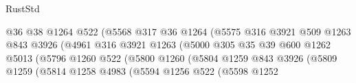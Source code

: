 \begin{lexlean}{RustStd}
\begin{coremodule}
                                            @36
                                            @38
                                            @1264
                                            @522
                                            (@5568
                                              @317
                                              @36
                                              @1264
                                              (@5575
                                                @316
                                                @3921
                                                @509
                                                @1263
                                                @843
                                                @3926
                                                (@4961
                                                  @316
                                                  @3921
                                                  @1263
                                                  (@5000
                                                    @305
                                                    @35
                                                    @39
                                                    @600
                                                    @1262
                                                    @5013
                                                    (@5796
                                                      @1260
                                                      @522
                                                      (@5800
                                                        @1260
                                                        (@5804
                                                          @1259
                                                          @843
                                                          @3926
                                                          (@5809
                                                            @1259
                                                            (@5814
                                                              @1258
                                                              @4983
                                                              (@5594
                                                                @1256
                                                                @522
                                                                (@5598
                                                                  @1252

\end{coremodule}
\end{lexlean}
